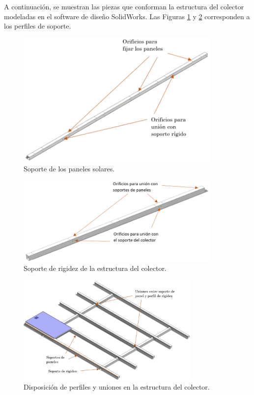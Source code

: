 A continuación, se muestran las piezas que conforman la estructura del colector modeladas en el software de diseño SolidWorks. Las Figuras \ref{fig:colec1} y \ref{fig:colec2} corresponden a los perfiles de soporte.
\begin{figure}[H]
	\centering
	\includegraphics[width=10cm]{imagenes/colec1}
	\caption{Soporte de los paneles solares.}
	\label{fig:colec1}
\end{figure}
\begin{figure}[H]
	\centering
	\includegraphics[width=10cm]{imagenes/colec2}
	\caption{Soporte de rigidez de la estructura del colector.}
	\label{fig:colec2}
\end{figure}
\begin{figure}[H]
	\centering
	\includegraphics[width=9cm]{imagenes/colec3}
	\caption{Disposición de perfiles y uniones en la estructura del colector.}
	\label{fig:colec3}
\end{figure}

